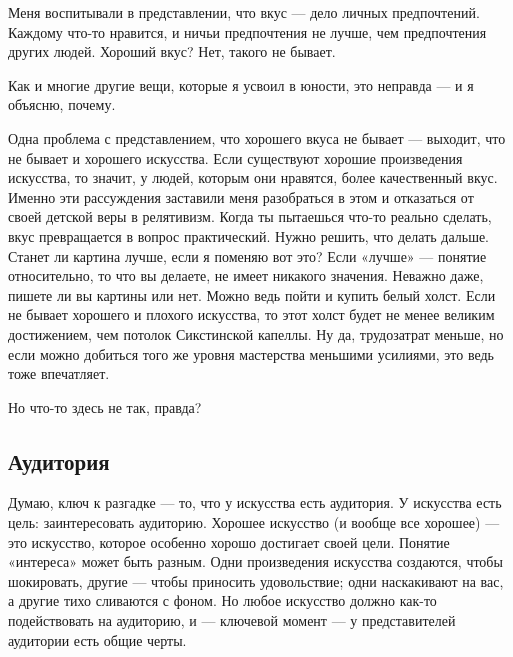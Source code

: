 \documentclass[ebook,12pt,oneside,openany]{memoir}
\begin{document}
\maketitle

Меня воспитывали в представлении, что вкус — дело личных предпочтений.
Каждому что-то нравится, и ничьи предпочтения не лучше, чем
предпочтения других людей. Хороший вкус? Нет, такого не бывает. \newline

Как и многие другие вещи, которые я усвоил в юности, это неправда — и
я объясню, почему. \newline

Одна проблема с представлением, что хорошего вкуса не бывает —
выходит, что не бывает и хорошего искусства. Если существуют хорошие
произведения искусства, то значит, у людей, которым они нравятся,
более качественный вкус. Именно эти рассуждения заставили меня
разобраться в этом и отказаться от своей детской веры в релятивизм.
Когда ты пытаешься что-то реально сделать, вкус превращается в вопрос
практический. Нужно решить, что делать дальше. Станет ли картина
лучше, если я поменяю вот это? Если «лучше» — понятие относительно, то
что вы делаете, не имеет никакого значения. Неважно даже, пишете ли вы
картины или нет. Можно ведь пойти и купить белый холст. Если не бывает
хорошего и плохого искусства, то этот холст будет не менее великим
достижением, чем потолок Сикстинской капеллы. Ну да, трудозатрат
меньше, но если можно добиться того же уровня мастерства меньшими
усилиями, это ведь тоже впечатляет. \newline

Но что-то здесь не так, правда? \newline

\subsection{Аудитория}

Думаю, ключ к разгадке — то, что у искусства есть аудитория.
У искусства есть цель: заинтересовать аудиторию. Хорошее искусство (и
вообще все хорошее) — это искусство, которое особенно хорошо достигает
своей цели. Понятие «интереса» может быть разным. Одни произведения
искусства создаются, чтобы шокировать, другие — чтобы приносить
удовольствие; одни наскакивают на вас, а другие тихо сливаются с
фоном. Но любое искусство должно как-то подействовать на аудиторию, и
— ключевой момент — у представителей аудитории есть общие черты. \newline
\end{document}
